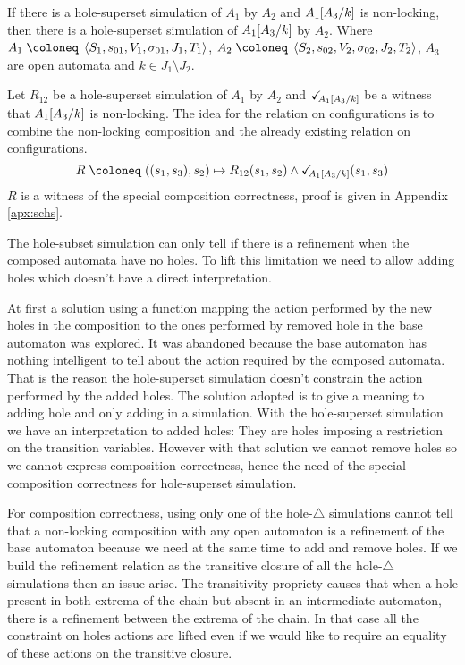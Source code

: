 \documentclass{article}
\begin{document}
\begin{prop}
If there is a hole-superset simulation of \(A_1\) by \(A_2\) and \(A_1{\left[A_3\middle/k\right]}\) is non-locking, then there is a hole-superset simulation of \(A_1{\left[A_3\middle/k\right]}\) by \(A_2\).
Where \(A_1 \defobject \OAg[1]\), \(A_2 \defobject \OAg[2]\), \(A_3\) are open automata and \(k \in J_1 \setminus J_2\).
\end{prop}
\begin{proofsketch}
Let \(R_{12}\) be a hole-superset simulation of \(A_1\) by \(A_2\) and \(\checkmark_{\!\! A_1{\left[A_3\middle/k\right]}}\) be a witness that \(A_1{\left[A_3\middle/k\right]}\) is non-locking.
The idea for the relation on configurations is to combine the non-locking composition and the already existing relation on configurations.
\[ R \defobject \mpar{\mpar{s_1, s_3}, s_2} \mapsto R_{12}\mpar{s_1, s_2} \wedge \reach{A_1\subst{A_3}{k}}\mpar{s_1, s_3} \]
\(R\) is a witness of the special composition correctness, proof is given in Appendix \ref{apx:schs}.
\end{proofsketch}
The hole-subset simulation can only tell if there is a refinement when the composed automata have no holes.
To lift this limitation we need to allow adding holes which doesn't have a direct interpretation.

At first a solution using a function mapping the action performed by the new holes in the composition to the ones performed by removed hole in the base automaton was explored.
It was abandoned because the base automaton has nothing intelligent to tell about the action required by the composed automata.
That is the reason the hole-superset simulation doesn't constrain the action performed by the added holes.
The solution adopted is to give a meaning to adding hole and only adding in a simulation.
With the hole-superset simulation we have an interpretation to added holes:
They are holes imposing a restriction on the transition variables.
However with that solution we cannot remove holes so we cannot express composition correctness, hence the need of the special composition correctness for hole-superset simulation.

For composition correctness, using only one of the hole-\(\triangle\) simulations cannot tell that a non-locking composition with any open automaton is a refinement of the base automaton because we need at the same time to add and remove holes.
If we build the refinement relation as the transitive closure of all the hole-\(\triangle\) simulations then an issue arise.
The transitivity propriety causes that when a hole present in both extrema of the chain but absent in an intermediate automaton, there is a refinement between the extrema of the chain.
In that case all the constraint on holes actions are lifted even if we would like to require an equality of these actions on the transitive closure.
\end{document}
